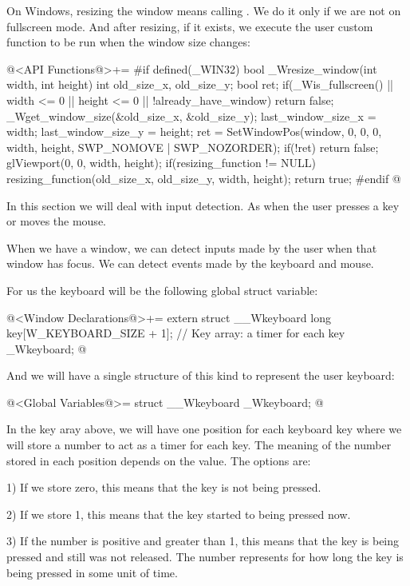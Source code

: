
On Windows, resizing the window means
calling . We do it only if we are not on
fullscreen mode. And after resizing, if it exists, we execute the user
custom function to be run when the window size changes:

\iniciocodigo
@<API Functions@>+=
#if defined(_WIN32)
bool _Wresize_window(int width, int height){
  int old_size_x, old_size_y;
  bool ret;
  if(_Wis_fullscreen() || width <= 0 || height <= 0 || !already_have_window)
    return false;
  _Wget_window_size(&old_size_x, &old_size_y);
  last_window_size_x = width;
  last_window_size_y = height;
  ret = SetWindowPos(window, 0, 0, 0, width, height, SWP_NOMOVE | SWP_NOZORDER);
  if(!ret)
    return false;
  glViewport(0, 0, width, height);
  if(resizing_function != NULL)
    resizing_function(old_size_x, old_size_y, width, height);
  return true;
}
#endif
@


In this section we will deal with input detection. As when the user
presses a key or moves the mouse.


When we have a window, we can detect inputs made by the user when that
window has focus. We can detect events made by the keyboard and mouse.

For us the keyboard will be the following global struct variable:

\iniciocodigo
@<Window Declarations@>+=
extern struct __Wkeyboard{
  long key[W_KEYBOARD_SIZE + 1]; // Key array: a timer for each key
} _Wkeyboard;
@
\fimcodigo

And we will have a single structure of this kind to represent the user
keyboard:

\iniciocodigo
@<Global Variables@>=
struct __Wkeyboard _Wkeyboard;
@
\fimcodigo


In the key aray above, we will have one position for each keyboard key
where we will store a number to act as a timer for each key. The
meaning of the number stored in each position depends on the
value. The options are:

1) If we store zero, this means that the key is not being pressed.

2) If we store 1, this means that the key started to being pressed now.

3) If the number is positive and greater than 1, this means that the
key is being pressed and still was not released. The number represents
for how long the key is being pressed in some unit of time.


